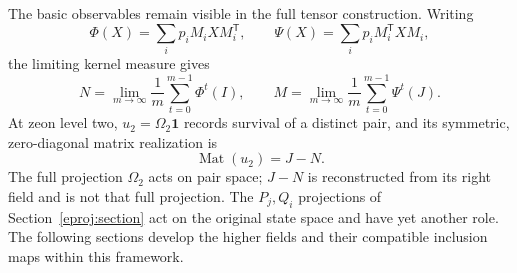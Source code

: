 The basic observables remain visible in the full tensor construction.
Writing
\[
 \Phi(X)=\sum_i p_iM_iXM_i^{\mathsf T},\qquad
 \Psi(X)=\sum_i p_iM_i^{\mathsf T}XM_i,
\]
the limiting kernel measure gives
\[
 N=\lim_{m\to\infty}\frac1m\sum_{t=0}^{m-1}\Phi^t(I),\qquad
 M=\lim_{m\to\infty}\frac1m\sum_{t=0}^{m-1}\Psi^t(J).
\]
At zeon level two, $u_2=\Omega_2\mathbf1$ records survival of a distinct
pair, and its symmetric, zero-diagonal matrix realization is
\[
 \boxed{\operatorname{Mat}(u_2)=J-N.}
\]
The full projection $\Omega_2$ acts on pair space; $J-N$ is reconstructed
from its right field and is not that full projection. The $P_j,Q_i$
projections of Section~\ref{eproj:section} act on the original state space
and have yet another role. The following sections develop the higher
fields and their compatible inclusion maps within this framework.

